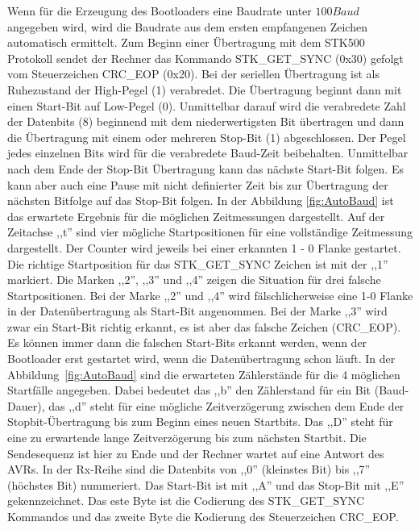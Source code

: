 Wenn für die Erzeugung des Bootloaders eine Baudrate unter \(100Baud\)
angegeben wird, wird die Baudrate aus dem ersten empfangenen Zeichen
automatisch ermittelt.
Zum Beginn einer Übertragung mit dem STK500 Protokoll sendet der Rechner
das Kommando STK\_GET\_SYNC (0x30) gefolgt vom Steuerzeichen CRC\_EOP (0x20).
Bei der seriellen Übertragung ist als Ruhezustand der High-Pegel (1)
verabredet. Die Übertragung beginnt dann mit einen Start-Bit auf Low-Pegel (0).
Unmittelbar darauf wird die verabredete Zahl der Datenbits (8) beginnend
mit dem niederwertigsten Bit übertragen und dann die Übertragung mit einem oder
mehreren Stop-Bit (1) abgeschlossen. 
Der Pegel jedes einzelnen Bits wird für die verabredete Baud-Zeit beibehalten.
Unmittelbar nach dem Ende der Stop-Bit Übertragung kann das nächste Start-Bit
folgen. Es kann aber auch eine Pause mit nicht definierter Zeit bis zur 
Übertragung der nächsten Bitfolge auf das Stop-Bit folgen. 
In der Abbildung \ref{fig:AutoBaud} ist das erwartete Ergebnis für die möglichen
Zeitmessungen dargestellt. Auf der Zeitachse ,,t'' sind vier mögliche Startpositionen
für eine vollständige Zeitmessung dargestellt. Der Counter wird jeweils
bei einer erkannten 1 - 0 Flanke gestartet. Die richtige Startposition
für das STK\_GET\_SYNC Zeichen ist mit der ,,1'' markiert.
Die Marken ,,2'', ,,3'' und ,,4'' zeigen die Situation für drei falsche Startpositionen.
Bei der Marke ,,2'' und ,,4'' wird fälschlicherweise eine 1-0 Flanke in der
Datenübertragung als Start-Bit angenommen. Bei der Marke ,,3'' wird zwar
ein Start-Bit richtig erkannt, es ist aber das falsche Zeichen (CRC\_EOP).
Es können immer dann die falschen Start-Bits erkannt werden, wenn der Bootloader
erst gestartet wird, wenn die Datenübertragung schon läuft.
In der Abbildung~\ref{fig:AutoBaud} sind die erwarteten Zählerstände für die
4 möglichen Startfälle angegeben. Dabei bedeutet das ,,b'' den Zählerstand
für ein Bit (Baud-Dauer), das ,,d'' steht für eine mögliche Zeitverzögerung
zwischen dem Ende der Stopbit-Übertragung bis zum Beginn eines neuen Startbits.
Das ,,D'' steht für eine zu erwartende lange Zeitverzögerung bis zum nächsten
Startbit. Die Sendesequenz ist hier zu Ende und der Rechner wartet auf eine
Antwort des AVRs.
In der Rx-Reihe sind die Datenbits von ,,0'' (kleinstes Bit) bis ,,7'' (höchstes Bit)
nummeriert. Das Start-Bit ist mit ,,A'' und das Stop-Bit mit ,,E'' gekennzeichnet.
Das este Byte ist die Codierung des STK\_GET\_SYNC Kommandos und das zweite Byte
die Kodierung des Steuerzeichen CRC\_EOP.


